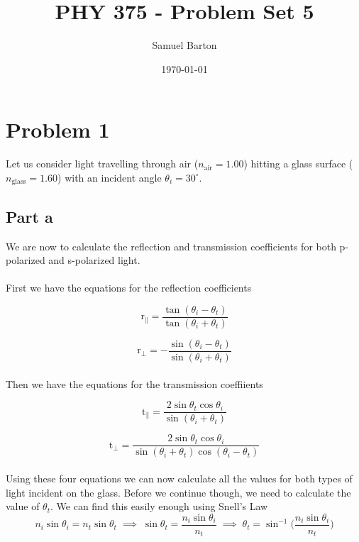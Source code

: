 \documentclass{article}
\title{PHY 375 - Problem Set 5}
\author{Samuel Barton}
\date{\today}
\begin{document}
	
	\maketitle
	
	\section*{Problem 1}
	
	Let us consider light travelling through air ($n_{\mathrm{air}} = 1.00$)  hitting a glass surface ($n_{\mathrm{glass}} = 1.60$) with an incident angle
	$\theta_i = 30^{\circ}$. 
	
	\subsection*{Part a}
	
	We are now to calculate the reflection and transmission coefficients for both p-polarized and s-polarized light.
	\\
	\\
	First we have the equations for the reflection coefficients
	
	\begin{equation} \label{r_par}
		\mathrm{r}_\parallel = \dfrac{\tan (\theta_i - \theta_t)}{\tan (\theta_i + \theta_t)}
	\end{equation}
	
	\begin{equation} \label{r_per}
		\mathrm{r}_\bot = -\dfrac{\sin (\theta_i - \theta_t)}{\sin (\theta_i + \theta_t)}
	\end{equation}
	\\
	Then we have the equations for the transmission coeffiients
	
	\begin{equation} \label{t_par}
		\mathrm{t}_\parallel = \dfrac{2\sin\theta_t\cos\theta_i}{\sin(\theta_i + \theta_t)}
	\end{equation}
	
	\begin{equation} \label{t_per}
		\mathrm{t}_\bot = \dfrac{2\sin\theta_t\cos\theta_i}{\sin(\theta_i + \theta_t)\cos(\theta_i - \theta_t)}
	\end{equation}
	\\
	Using these four equations we can now calculate all the values for both types of light incident on the glass. Before we continue though, we need
	to calculate the value of $\theta_t$. We can find this easily enough using Snell's Law
	\begin{equation*}
		n_i \sin \theta_i = n_t \sin \theta_t \; \implies 
		\; \sin \theta_t = \dfrac{n_i \sin\theta_i}{n_t} \; \implies 
		\; \theta_t = \sin^{-1}\Big(\dfrac{n_i \sin\theta_i}{n_t}\Big)
	\end{equation*}
	
\end{document}
